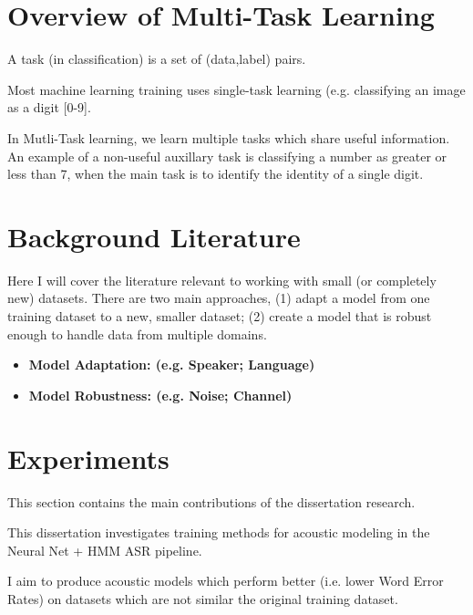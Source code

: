 \documentclass[10pt,a4paper]{article}
\begin{document}
\section{Overview of Multi-Task Learning}

A task (in classification) is a set of (data,label) pairs.

Most machine learning training uses single-task learning (e.g. classifying an image as a digit [0-9].

In Mutli-Task learning, we learn multiple tasks which share useful information. An example of a non-useful auxillary task is classifying a number as greater or less than 7, when the main task is to identify the identity of a single digit.



\section{Background Literature}

Here I will cover the literature relevant to working with small (or completely new) datasets. There are two main approaches, (1) adapt a model from one training dataset to a new, smaller dataset; (2) create a model that is robust enough to handle data from multiple domains. 

\begin{itemize}

\item \textbf{Model Adaptation: (e.g. Speaker; Language)}

    
  
\item \textbf{Model Robustness: (e.g. Noise; Channel)}

  
\end{itemize}




\section{Experiments}

This section contains the main contributions of the dissertation research.

This dissertation investigates training methods for acoustic modeling in the Neural Net + HMM ASR pipeline.

I aim to produce acoustic models which perform better (i.e. lower Word Error Rates) on datasets which are not similar the original training dataset.
\end{document}
